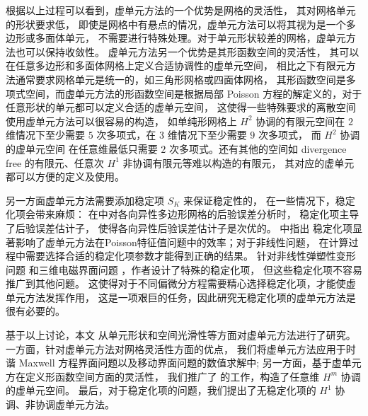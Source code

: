 根据以上过程可以看到，虚单元方法的一个优势是网格的灵活性，
其对网格单元的形状要求低，
即使是网格中有悬点的情况，虚单元方法可以将其视为是一个多边形或多面体单元，
不需要进行特殊处理。对于单元形状较差的网格，虚单元方法也可以保持收敛性\cite{
2018BrennerSung, 2018CaoChen, 2021CaoChenGuo}。
虚单元方法另一个优势是其形函数空间的灵活性，
其可以在任意多边形和多面体网格上定义合适协调性的虚单元空间，
相比之下有限元方法通常要求网格单元是统一的，如三角形网格或四面体网格，
其形函数空间是多项式空间，而虚单元方法的形函数空间是根据局部 Poisson
方程的解定义的，对于任意形状的单元都可以定义合适的虚单元空间，
这使得一些特殊要求的离散空间使用虚单元方法可以很容易的构造，
如单纯形网格上 $H^2$ 协调的有限元空间在 $2$
维情况下至少需要 $5$ 次多项式，在 $3$ 维情况下至少需要 $9$ 次多项式，
而 $H^2$ 协调的虚单元空间\cite{BeiraodaVeigaDassiRusso2020} 
在任意维最低只需要 $2$ 次多项式。还有其他的空间如
divergence free 的有限元、任意次 $H^1$
非协调有限元等难以构造的有限元，
其对应的虚单元都可以方便的定义及使用。

另一方面虚单元方法需要添加稳定项 $S_K$ 来保证稳定性的，
在一些情况下，稳定化项会带来麻烦：
在\cite{AntoniettiBerroneBorioDAuriaEtAl2022}中对各向异性多边形网格的后验误差分析时，
稳定化项主导了后验误差估计子，
使得各向异性后验误差估计子是次优的。
\cite{BoffiGardiniGastaldi2020} 中指出
稳定化项显著影响了虚单元方法在Poisson特征值问题中的效率；对于非线性问题，
在计算过程中需要选择合适的稳定化项参数才能得到正确的结果\cite{XU2023116555}。
针对非线性弹塑性变形问题
\cite{HudobivnikAldakheelWriggers2019} 和三维电磁界面问题
\cite{CaoChenGuo2023}，作者设计了特殊的稳定化项，
但这些稳定化项不容易推广到其他问题。
这使得对于不同偏微分方程需要精心选择稳定化项，才能使虚单元方法发挥作用，
这是一项艰巨的任务，因此研究无稳定化项的虚单元方法是很有必要的。

基于以上讨论，本文
从单元形状和空间光滑性等方面对虚单元方法进行了研究。
一方面，针对虚单元方法对网格灵活性方面的优点，
我们将虚单元方法应用于时谐 Maxwell 方程界面问题以及移动界面问题的数值求解中;
另一方面，基于虚单元方在定义形函数空间方面的灵活性，
我们推广了 \cite{BeiraoManzini2014,AntoniettiManziniVerani2020,
AntoniettiManziniScacchiVerani2021,BrezziMarini2013} 的工作，构造了任意维 
$H^m$ 协调的虚单元空间。
最后，对于稳定化项的问题，我们提出了无稳定化项的 $H^1$ 协调、非协调虚单元方法。

